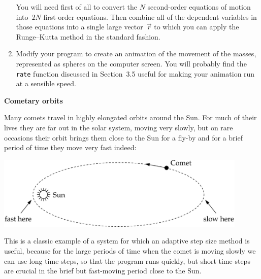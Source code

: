 \documentclass[12pt]{article}
\begin{document}
\begin{exercises}
\begin{enumerate}
  You will need first of all to convert the $N$ second-order equations of
  motion into~$2N$ first-order equations.  Then combine all of the
  dependent variables in those equations into a single large
  vector~$\vec{r}$ to which you can apply the Runge--Kutta method in the
  standard fashion.
\item Modify your program to create an animation of the movement of the
  masses, represented as spheres on the computer screen.  You will probably
  find the \verb|rate| function discussed in Section~3.5 useful for making
  your animation run at a sensible speed.
\end{enumerate}



\exercise \textbf{Cometary orbits}

\exskip Many comets travel in highly elongated orbits around the Sun.  For
much of their lives they are far out in the solar system, moving very
slowly, but on rare occasions their orbit brings them close to the Sun for
a fly-by and for a brief period of time they move very fast indeed:
\bigskip
\begin{center}
\includegraphics[width=12cm]{orbit.eps}
\end{center}
\bigskip This is a classic example of a system for which an adaptive
step size method is useful, because for the large periods of time when the
comet is moving slowly we can use long time-steps, so that the program runs
quickly, but short time-steps are crucial in the brief but fast-moving
period close to the Sun.


\end{exercises}
\end{document}
